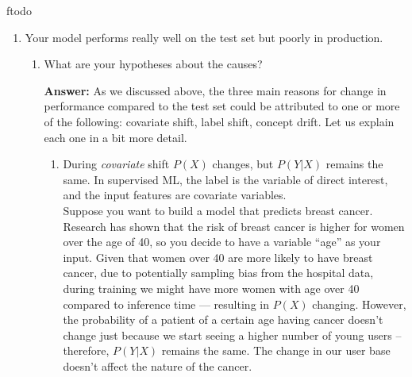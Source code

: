 ƒtodo\documentclass{article}
\newenvironment{QandA}{\begin{enumerate}[label=\arabic*.]}{\end{enumerate}}
\newenvironment{InnerQandA}{\begin{enumerate}[label=\roman*.]}{\end{enumerate}}
\newenvironment{ListAlph}{\begin{enumerate}[label=(\alph*)]}{\end{enumerate}}
\newenvironment{answer}{\par\normalfont \textbf{Answer:}}{}
\newcommand{\g}{\vert}
\begin{document}
\begin{QandA}
\begin{answer}
\begin{ListAlph}
            \item \textit{Bias}. One should do extensive testing and model validation to confirm that the model doesn't perpetuate potential biases that can occur in the training data, such as racial and gender stereotypes. Moreover, it's important to design post-hoc safety systems that prevent users with malicious intents.
        \end{ListAlph}

        (Source: \href{https://huyenchip.com/machine-learning-systems-design/design-a-machine-learning-system.html#serving-091rIYw}{Chip Huyen's ML system design interview booklet})
    \end{answer}

    
    \item Your model performs really well on the test set but poorly in production.
    \begin{InnerQandA}
        \item What are your hypotheses about the causes?
        \begin{answer}
            As we discussed above, the three main reasons for change in performance compared to the test set could be attributed to one or more of the following: covariate shift, label shift, concept drift. Let us explain each one in a bit more detail.
            
            \begin{ListAlph}

            \item During \textit{covariate} shift $P(X)$ changes, but $P(Y \g X)$ remains the same. In supervised ML, the label is the variable of direct interest, and the input features are covariate variables. \\

            Suppose you want to build a model that predicts breast cancer. Research has shown that the risk of breast cancer is higher for women over the age of 40, so you decide to have a variable “age” as your input. Given that women over 40 are more likely to have breast cancer,  due to potentially sampling bias from the hospital data, during training we might have more women with age over 40 compared to inference time — resulting in $P(X)$ changing. However, the probability of a patient of a certain age having cancer doesn't change just because we start seeing a higher number of young users -- therefore, $P(Y \g X)$ remains the same. The change in our user base doesn't affect the nature of the cancer. \\
        

\end{ListAlph}
\end{answer}
\end{InnerQandA}
\end{QandA}
\end{document}
